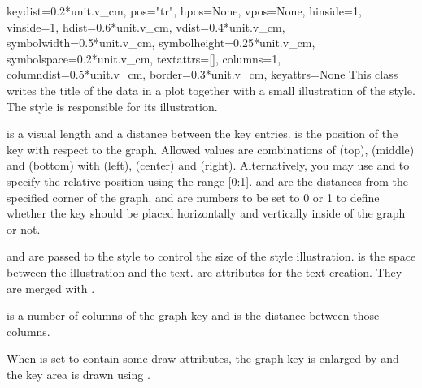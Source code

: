 \begin{classdesc}{key}{dist=0.2*unit.v\_cm,
                       pos="tr", hpos=None, vpos=None,
                       hinside=1, vinside=1,
                       hdist=0.6*unit.v\_cm,
                       vdist=0.4*unit.v\_cm,
                       symbolwidth=0.5*unit.v\_cm,
                       symbolheight=0.25*unit.v\_cm,
                       symbolspace=0.2*unit.v\_cm,
                       textattrs=[],
                       columns=1, columndist=0.5*unit.v\_cm,
                       border=0.3*unit.v\_cm, keyattrs=None}
  This class writes the title of the data in a plot together with a
  small illustration of the style. The style is responsible for its
  illustration.

   is a visual length and a distance between the key
  entries.  is the position of the key with respect to the
  graph. Allowed values are combinations of  (top),
   (middle) and  (bottom) with  (left),
   (center) and  (right). Alternatively, you may
  use  and  to specify the relative position
  using the range [0:1].  and  are the distances
  from the specified corner of the graph.  and
   are numbers to be set to 0 or 1 to define whether the
  key should be placed horizontally and vertically inside of the graph
  or not.

   and  are passed to the style to
  control the size of the style illustration.  is the
  space between the illustration and the text.  are
  attributes for the text creation. They are merged with
  .

   is a number of columns of the graph key and
   is the distance between those columns.

  When  is set to contain some draw attributes, the
  graph key is enlarged by  and the key area is drawn
  using .
\end{classdesc} %

